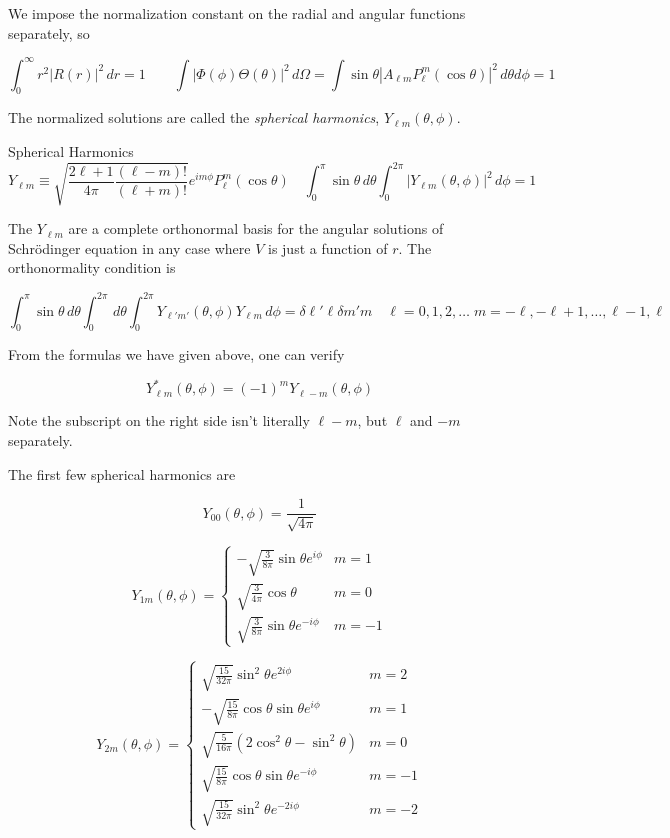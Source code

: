 We impose the normalization constant on the radial and angular functions
separately, so 

\[
\int_{0}^{\infty} r^2|R(r)|^2 \, dr = 1 \qquad \int |\Phi(\phi)\Theta(\theta)
|^2 \, d\Omega = \int \sin\theta |A_{\ell m} P_\ell^{m}(\cos \theta)|^2 \,
d\theta d\phi =1
\] \vspace{3px}

The normalized solutions are called the \textit{spherical harmonics}, $Y_{\ell
m}(\theta, \phi)$. 

\begin{mainbox}{Spherical Harmonics}
  \[
  Y_{\ell m} \equiv \sqrt{\frac{2\ell+1}{4\pi} \frac{(\ell - m)!}{(\ell+m)!}}
  e^{im\phi} P_\ell^m (\cos\theta) \quad \int_{0}^{\pi} \sin\theta \, d\theta
  \int_{0}^{2\pi} |Y_{\ell m}(\theta, \phi)|^2 \, d\phi = 1
  \] 
\end{mainbox}

The $Y_{\ell m}$ are a complete orthonormal basis for the angular solutions of
Schr\"odinger equation in any case where $V$ is just a function of  $r$. The
orthonormality condition is 

\[
\int_{0}^{\pi} \sin\theta \, d\theta \int_{0}^{2\pi}  \, d\theta
\int_{0}^{2\pi} Y_{\ell' m'} (\theta,\phi) Y_{\ell m} \, d\phi = \delta{\ell'
\ell } \delta{m'm} \quad \ell = 0,1,2,\hdots \; m = -\ell, -\ell +1, \hdots,
\ell -1, \ell  
\] \vspace{3px}

From the formulas we have given above, one can verify 

\[
  Y_{\ell m}^* (\theta,\phi) = (-1)^{m} Y_{\ell -m} (\theta,\phi)
\] \vspace{3px}

Note the subscript on the right side isn't literally $\ell - m$, but $\ell
$ and $-m$ separately. 

The first few spherical harmonics are 

\[
Y_{00}(\theta, \phi) = \frac{1}{\sqrt{4\pi}}
\]

\[
Y_{1m}(\theta, \phi) = 
\begin{cases} 
-\sqrt{\frac{3}{8\pi}} \sin \theta e^{i\phi} & m = 1 \\
\sqrt{\frac{3}{4\pi}} \cos \theta & m = 0 \\
\sqrt{\frac{3}{8\pi}} \sin \theta e^{-i\phi} & m = -1
\end{cases}
\]

\[
Y_{2m}(\theta, \phi) = 
\begin{cases} 
\sqrt{\frac{15}{32\pi}} \sin^2 \theta e^{2i\phi} & m = 2 \\
-\sqrt{\frac{15}{8\pi}} \cos \theta \sin \theta e^{i\phi} & m = 1 \\
\sqrt{\frac{5}{16\pi}} (2\cos^2 \theta - \sin^2 \theta) & m = 0 \\
\sqrt{\frac{15}{8\pi}} \cos \theta \sin \theta e^{-i\phi} & m = -1 \\
\sqrt{\frac{15}{32\pi}} \sin^2 \theta e^{-2i\phi} & m = -2
\end{cases}
\] \vspace{3px}

